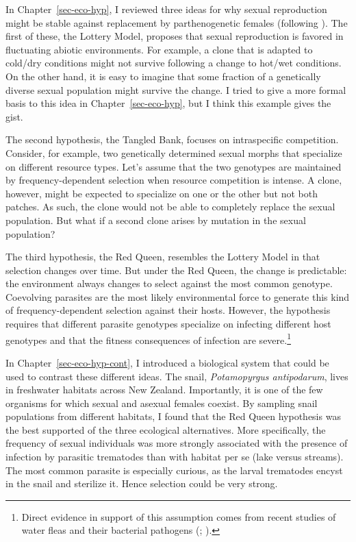 \documentclass[
  letterpaper,
]{book}
\begin{document}
In Chapter~\ref{sec-eco-hyp}, I reviewed three ideas for why sexual
reproduction might be stable against replacement by parthenogenetic
females (following ). The first of
these, the Lottery Model, proposes that sexual reproduction is favored
in fluctuating abiotic environments. For example, a clone that is
adapted to cold/dry conditions might not survive following a change to
hot/wet conditions. On the other hand, it is easy to imagine that some
fraction of a genetically diverse sexual population might survive the
change. I tried to give a more formal basis to this idea in
Chapter~\ref{sec-eco-hyp}, but I think this example gives the gist.

The second hypothesis, the Tangled Bank, focuses on intraspecific
competition. Consider, for example, two genetically determined sexual
morphs that specialize on different resource types. Let's assume that
the two genotypes are maintained by frequency-dependent selection when
resource competition is intense. A clone, however, might be expected to
specialize on one or the other but not both patches. As such, the clone
would not be able to completely replace the sexual population. But what
if a second clone arises by mutation in the sexual population?

The third hypothesis, the Red Queen, resembles the Lottery Model in that
selection changes over time. But under the Red Queen, the change is
predictable: the environment always changes to select against the most
common genotype. Coevolving parasites are the most likely environmental
force to generate this kind of frequency-dependent selection against
their hosts. However, the hypothesis requires that different parasite
genotypes specialize on infecting different host genotypes and that the
fitness consequences of infection are severe.\footnote{Direct evidence
  in support of this assumption comes from recent studies of water fleas
  and their bacterial pathogens (; ).}

In Chapter~\ref{sec-eco-hyp-cont}, I introduced a biological system that
could be used to contrast these different ideas. The snail,
\emph{Potamopyrgus antipodarum}, lives in freshwater habitats across New
Zealand. Importantly, it is one of the few organisms for which sexual
and asexual females coexist. By sampling snail populations from
different habitats, I found that the Red Queen hypothesis was the best
supported of the three ecological alternatives. More specifically, the
frequency of sexual individuals was more strongly associated with the
presence of infection by parasitic trematodes than with habitat per se
(lake versus streams). The most common parasite is especially curious,
as the larval trematodes encyst in the snail and sterilize it. Hence
selection could be very strong.
\end{document}
